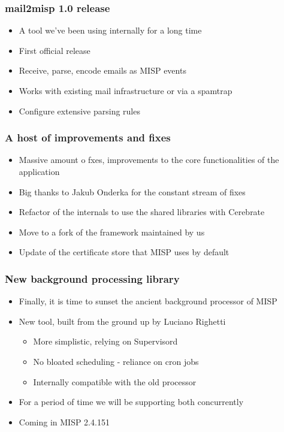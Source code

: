 \begin{frame}
\frametitle{mail2misp 1.0 release}
\begin{itemize}
	\item A tool we've been using internally for a long time
        \item First official release
        \item Receive, parse, encode emails as MISP events
        \item Works with existing mail infrastructure or via a spamtrap
        \item Configure extensive parsing rules
\end{itemize}
\end{frame}

\begin{frame}
\frametitle{A host of improvements and fixes}
\begin{itemize}
	\item Massive amount o fxes, improvements to the core functionalities of the application
        \item Big thanks to Jakub Onderka for the constant stream of fixes
        \item Refactor of the internals to use the shared libraries with Cerebrate
        \item Move to a fork of the framework maintained by us
        \item Update of the certificate store that MISP uses by default
\end{itemize}
\end{frame}

\begin{frame}
\frametitle{New background processing library}
\begin{itemize}
	\item Finally, it is time to sunset the ancient background processor of MISP
        \item New tool, built from the ground up by Luciano Righetti
        \begin{itemize}
            \item More simplistic, relying on Supervisord
            \item No bloated scheduling - reliance on cron jobs
            \item Internally compatible with the old processor
        \end{itemize}
        \item For a period of time we will be supporting both concurrently
        \item Coming in MISP 2.4.151
\end{itemize}
\end{frame}

